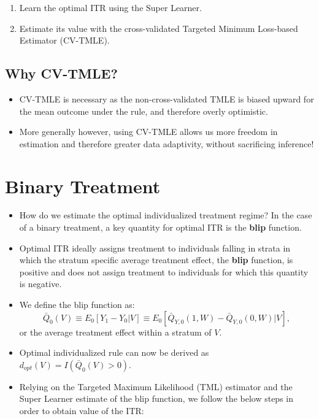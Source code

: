 \documentclass[
  12pt, krantz2,
]{book}
\theoremstyle{definition}
\theoremstyle{definition}
\theoremstyle{definition}
\newcommand{\1}{\mathbbm{1}}
\begin{document}
\begin{enumerate}
\def\labelenumi{\arabic{enumi}.}
\item
  Learn the optimal ITR using the Super Learner.
\item
  Estimate its value with the cross-validated Targeted Minimum Loss-based
  Estimator (CV-TMLE).
\end{enumerate}

\hypertarget{why-cv-tmle}{%
\subsection{Why CV-TMLE?}\label{why-cv-tmle}}

\begin{itemize}
\item
  CV-TMLE is necessary as the non-cross-validated TMLE is biased upward for the
  mean outcome under the rule, and therefore overly optimistic.
\item
  More generally however, using CV-TMLE allows us more freedom in estimation and
  therefore greater data adaptivity, without sacrificing inference!
\end{itemize}

\hypertarget{binary-treatment}{%
\section{Binary Treatment}\label{binary-treatment}}

\begin{itemize}
\item
  How do we estimate the optimal individualized treatment regime? In the case of
  a binary treatment, a key quantity for optimal ITR is the \textbf{blip} function.
\item
  Optimal ITR ideally assigns treatment to individuals falling in strata in
  which the stratum specific average treatment effect, the \textbf{blip} function, is
  positive and does not assign treatment to individuals for which this quantity
  is negative.
\item
  We define the blip function as: \[\bar{Q}_0(V) \equiv E_0[Y_1-Y_0|V] \equiv
  E_0[\bar{Q}_{Y,0}(1,W) - \bar{Q}_{Y,0}(0,W) | V], \] or the average treatment
  effect within a stratum of \(V\).
\item
  Optimal individualized rule can now be derived as \(d_{opt}(V) = I(\bar{Q}_{0}(V) > 0)\).
\item
  Relying on the Targeted Maximum Likelihood (TML) estimator and the Super
  Learner estimate of the blip function, we follow the below steps in order to
  obtain value of the ITR:
\end{itemize}
\end{document}
